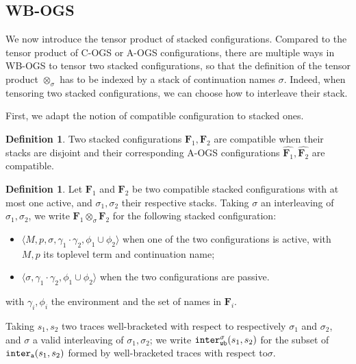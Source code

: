 \documentclass[11pt,a4paper]{amsart}
\theoremstyle{plain}
\theoremstyle{definition}
\theoremstyle{defC}
\theoremstyle{thmC}
\theoremstyle{plain}
\numberwithin{equation}{section}
\newcommand{\wrt}{with respect to\xspace}  %
\newcommand{\tr}{s}
\newcommand{\stt}{\sigma}
\newcommand{\AOGS}{\mbox{{\rm A-OGS}}\xspace}      %
\newcommand{\COGS}{\mbox{{\rm C-OGS}}\xspace}      %
\newcommand{\WBOGS}{\mbox{{\rm WB-OGS}}\xspace}      %
\newcommand{\interlA}[2]{{\tt inter_{a}}( #1, #2)}
\newcommand{\interlWB}[2]{{\tt inter_{wb}}( #1, #2)}
\newcommand{\interlWBs}[3]{{\tt inter_{wb}^{#1}}( #2, #3)}
\newcommand{\FF}{F}
\newcommand{\FFb}{{\bm{\FF}}} %
\newcommand{\es}{\eraseStack}
\newcommand{\conf}[1]{\langle #1\rangle}
\newcommand{\eraseStack}[1]{\widehat{#1}}
\newcommand{\Label}{{\rm pol}}
\theoremstyle{plain}
\theoremstyle{definition}
\newtheorem{definition}[thm]{Definition}
\begin{document}
\subsection{\WBOGS}
\label{a:tensor-wbogs}

  
We now introduce the tensor product of stacked configurations.
Compared to the tensor product of \COGS or \AOGS configurations,
there are multiple ways in \WBOGS
to tensor two stacked configurations, so that the definition of the 
tensor product $\otimes_{\stt}$ has to be 
indexed by a stack of continuation names $\stt$.
Indeed, when tensoring two stacked configurations, we can
choose how to interleave their stack.

First, we adapt the notion of compatible configuration
to stacked ones.
\begin{definition}
 Two stacked configurations $\FFb_1,\FFb_2$ are compatible 
 when their stacks are disjoint and 
 their corresponding \AOGS
 configurations $\es{\FFb_1},\es{\FFb_2}$ are compatible.
\end{definition}


\begin{definition}
Let $\FFb_1$ and $\FFb_2$ be two compatible stacked configurations
with at most one active,
and $\stt_1,\stt_2$ their respective stacks.  
Taking $\stt$ an interleaving of $\stt_1,\stt_2$,
we write $\FFb_1 \otimes_{\stt} \FFb_2$ for the following 
stacked configuration:
\begin{itemize}
 \item $\conf{M,p,\stt,\gamma_1 \cdot \gamma_2,\phi_1 \cup \phi_2}$
 when one of the two configurations is active, with $M,p$
 its toplevel term and continuation name;
 \item $\conf{\stt,\gamma_1 \cdot \gamma_2,\phi_1 \cup \phi_2}$
 when the two configurations are passive.
\end{itemize}
with $\gamma_i,\phi_i$ the environment and the set of names in $\FFb_i$.
\end{definition}
\noindent
Taking $\tr_1,\tr_2$ two traces well-bracketed 
\wrt respectively $\stt_1$ and $\stt_2$,
and $\stt$ a valid interleaving of 
$\stt_1,\stt_2$;
we write $\interlWBs{\stt}{\tr_1}{\tr_2}$ for the subset of $\interlA{\tr_1}{\tr_2}$
formed by well-bracketed traces \wrt $\stt$.
\end{document}
